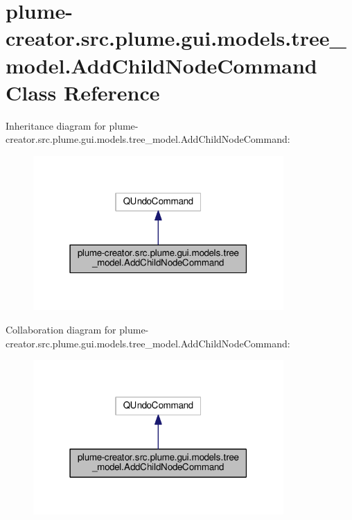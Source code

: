\hypertarget{classplume-creator_1_1src_1_1plume_1_1gui_1_1models_1_1tree__model_1_1_add_child_node_command}{}\section{plume-\/creator.src.\+plume.\+gui.\+models.\+tree\+\_\+model.\+Add\+Child\+Node\+Command Class Reference}
\label{classplume-creator_1_1src_1_1plume_1_1gui_1_1models_1_1tree__model_1_1_add_child_node_command}


Inheritance diagram for plume-\/creator.src.\+plume.\+gui.\+models.\+tree\+\_\+model.\+Add\+Child\+Node\+Command\+:\nopagebreak
\begin{figure}[H]
\begin{center}
\leavevmode
\includegraphics[width=271pt]{classplume-creator_1_1src_1_1plume_1_1gui_1_1models_1_1tree__model_1_1_add_child_node_command__inherit__graph}
\end{center}
\end{figure}


Collaboration diagram for plume-\/creator.src.\+plume.\+gui.\+models.\+tree\+\_\+model.\+Add\+Child\+Node\+Command\+:\nopagebreak
\begin{figure}[H]
\begin{center}
\leavevmode
\includegraphics[width=271pt]{classplume-creator_1_1src_1_1plume_1_1gui_1_1models_1_1tree__model_1_1_add_child_node_command__coll__graph}
\end{center}
\end{figure}
